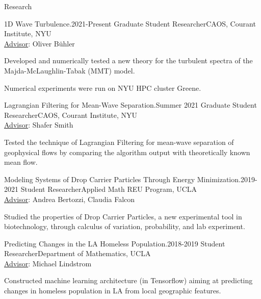 \documentclass{resume} %
\begin{document}
\begin{rSection}{Research}

\begin{rSubsection}{1D Wave Turbulence.}{2021-Present}
{Graduate Student Researcher}{CAOS, Courant Institute, NYU\\\underline{Advisor}: Oliver B\"uhler}
\item Developed and numerically tested a new theory for the turbulent spectra of the Majda-McLaughlin-Tabak (MMT) model.
\item Numerical experiments were run on NYU HPC cluster Greene.
\end{rSubsection}

\begin{rSubsection}{Lagrangian Filtering for Mean-Wave Separation.}{Summer 2021}
{Graduate Student Researcher}{CAOS, Courant Institute, NYU\\\underline{Advisor}: Shafer Smith}
\item Tested the technique of Lagrangian Filtering for mean-wave separation of geophysical flows by comparing the algorithm output with theoretically known mean flow.
\end{rSubsection}

\begin{rSubsection}{Modeling Systems of Drop Carrier Particles Through Energy
Minimization.}{2019-2021}
{Student Researcher}{Applied Math REU Program, UCLA\\\underline{Advisor}: Andrea Bertozzi, Claudia Falcon}
\item Studied the properties of Drop Carrier Particles, a new experimental tool in biotechnology, through calculus of variation, probability, and lab experiment.
\end{rSubsection}

\begin{rSubsection}{Predicting Changes in the LA Homeless Population.}{2018-2019}
{Student Researcher}{Department of Mathematics, UCLA\\\underline{Advisor}: Michael Lindstrom}
\item Constructed machine learning architecture (in Tensorflow) aiming at predicting changes in homeless population in LA from local geographic features. 
\end{rSubsection}

\end{rSection}

\end{document}
